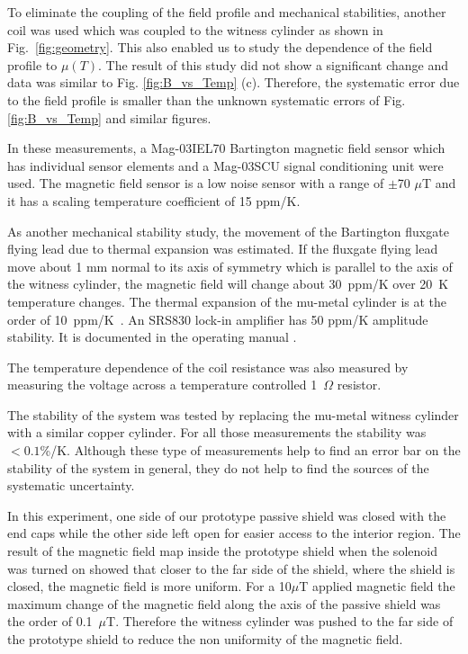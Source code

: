 \documentclass[review]{elsarticle}
\begin{document}
To eliminate the coupling of the field profile and mechanical
stabilities, another coil was used which was coupled to the witness
cylinder as shown in Fig.~\ref{fig:geometry}.  This also enabled us to
study the dependence of the field profile to $\mu(T)$. The result of
this study did not show a significant change and data was similar to
Fig. \ref{fig:B_vs_Temp} (c). Therefore, the systematic error due to
the field profile is smaller than the unknown systematic errors of
Fig. \ref{fig:B_vs_Temp} and similar figures.


In these measurements, a Mag-03IEL70 Bartington magnetic field sensor which has individual sensor elements and a Mag-03SCU signal conditioning unit were used.
The magnetic field sensor is a low noise sensor with a range of $\pm$70 $\mu$T and it has a scaling temperature coefficient of 15 ppm/K.


As another mechanical stability study, the movement of the Bartington
fluxgate flying lead due to thermal expansion was estimated. If the
fluxgate flying lead move about 1 mm normal to its axis of symmetry
which is parallel to the axis of the witness cylinder, the magnetic
field will change about 30~ppm/K over 20~K temperature changes.  The
thermal expansion of the mu-metal cylinder is at the order of
10~ppm/K~\cite{kruppvdm}.  An SRS830 lock-in amplifier has 50
ppm/K amplitude stability. It is documented in the operating
manual \cite{bib:lockin}.

The temperature dependence of the coil resistance was also measured by
measuring the voltage across a temperature controlled 1~$\Omega$
resistor.

The stability of the system was tested by replacing the mu-metal
witness cylinder with a similar copper cylinder. For all those
measurements the stability was $<0.1$\%/K. Although these type of
measurements help to find an error bar on the stability of the system
in general, they do not help to find the sources of the systematic
uncertainty.


In this experiment, one side of our prototype passive shield was closed with the end caps while the other side left open for easier access to the interior region. The result of the magnetic field map inside the prototype shield when the solenoid was  turned on showed that closer to the far side of the shield, where the shield is closed, the magnetic field is more uniform. For a 10$\mu$T applied magnetic field the maximum change of the magnetic field along the axis of the passive shield was the order of 0.1~$\mu$T.
Therefore the witness cylinder was pushed to the far side of the prototype shield to reduce the non uniformity of the magnetic field.
\end{document}

